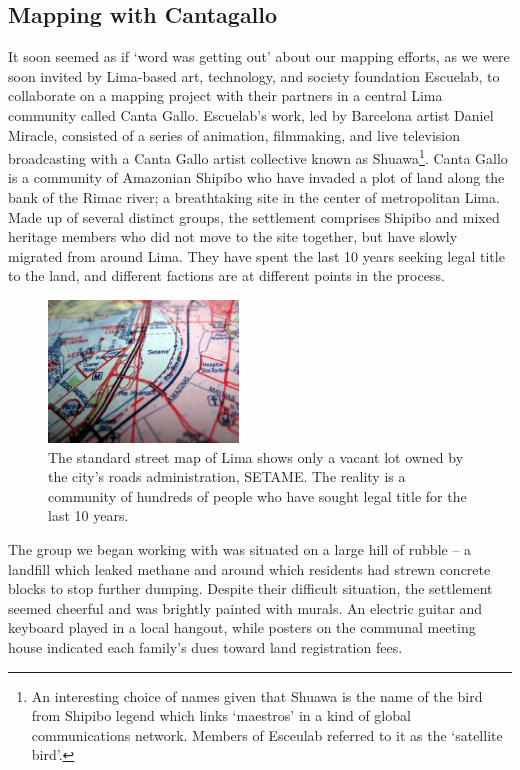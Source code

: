 \documentclass[11pt]{report}
\begin{document}
\subsection{Mapping with Cantagallo}

It soon seemed as if `word was getting out' about our mapping efforts, as we were soon invited by Lima-based art, technology, and society foundation Escuelab, to collaborate on a mapping project with their partners in a central Lima community called Canta Gallo. Escuelab's work, led by Barcelona artist Daniel Miracle, consisted of a series of animation, filmmaking, and live television broadcasting with a Canta Gallo artist collective known as Shuawa\footnote{An interesting choice of names given that Shuawa is the name of the bird from Shipibo legend which links `maestros' in a kind of global communications network. Members of Esceulab referred to it as the `satellite bird'.}. Canta Gallo is a community of Amazonian Shipibo who have invaded a plot of land along the bank of the Rimac river; a breathtaking site in the center of metropolitan Lima. Made up of several distinct groups, the settlement comprises Shipibo and mixed heritage members who did not move to the site together, but have slowly migrated from around Lima. They have spent the last 10 years seeking legal title to the land, and different factions are at different points in the process. 

\begin{figure}
	\begin{flushright}
		\includegraphics[width=0.45\textwidth]{images/canta-gallo-setame.jpg}
		\caption{The standard street map of Lima shows only a vacant lot owned by the city's roads administration, SETAME. The reality is a community of hundreds of people who have sought legal title for the last 10 years.} 
	\end{flushright}
\end{figure}

The group we began working with was situated on a large hill of rubble -- a landfill which leaked methane and around which residents had strewn concrete blocks to stop further dumping. Despite their difficult situation, the settlement seemed cheerful and was brightly painted with murals. An electric guitar and keyboard played in a local hangout, while posters on the communal meeting house indicated each family's dues toward land registration fees. 
\end{document}
